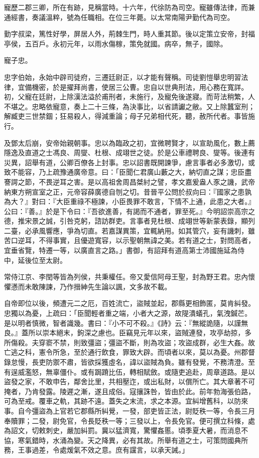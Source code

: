 \begin{pinyinscope}
寵歷二郡三卿，所在有跡，見稱當時。十六年，代徐防為司空。寵雖傳法律，而兼通經書，奏議溫粹，號為任職相。在位三年薨。以太常南陽尹勤代為司空。

勤字叔梁，篤性好學，屏居人外，荊棘生門，時人重其節。後以定策立安帝，封福亭侯，五百戶。永初元年，以雨水傷稼，策免就國。病卒，無子，國除。

寵子忠。

忠字伯始，永始中辟司徒府，三遷廷尉正，以才能有聲稱。司徒劉愷舉忠明習法律，宜備機密，於是擢拜尚書，使居三公曹。忠自以世典刑法，用心務在寬詳。初，父寵在廷尉，上除漢法溢於甫刑者，未施行，及寵免後遂寢。而苛法稍繁，人不堪之。忠略依寵意，奏上二十三條，為決事比，以省請讞之敝。又上除蠶室刑；解臧吏三世禁錮；狂易殺人，得減重論；母子兄弟相代死，聽，赦所代者。事皆施行。

及鄧太后崩，安帝始親朝事。忠以為臨政之初，宜微聘賢才，以宣助風化，數上薦隱逸及直道之士馮良、周燮、杜根、成翊世之徒。於是公車禮聘良、燮等。後連有災異，詔舉有道，公卿百僚各上封事。忠以詔書既開諫爭，慮言事者必多激切，或致不能容，乃上疏豫通廣帝意。曰：「臣聞仁君廣山藪之大，納切直之謀；忠臣盡謇諤之節，不畏逆耳之害。是以高祖舍周昌桀紂之譬，孝文嘉爰盎人豕之譏，武帝納東方朔宣室之正，元帝容薛廣德自刎之切。昔晉平公問於叔向曰：『國家之患孰為大？』對曰：『大臣重祿不極諫，小臣畏罪不敢言，下情不上通，此患之大者。』公曰：『善。』於是下令曰：『吾欲進善，有謁而不通者，罪至死。』今明詔崇高宗之德，推宋景之誠，引咎克躬，諮訪群吏。言事者見杜根、成翊世等新蒙表錄，顯列二臺，必承風響應，爭為切直。若嘉謀異策，宜輒納用。如其管穴，妄有譏刺，雖苦口逆耳，不得事實，且優遊寬容，以示聖朝無諱之美。若有道之士，對問高者，宜垂省覽，特遷一等，以廣直言之路。」書御，有詔拜有道高第士沛國施延為侍中，延後位至太尉。

常侍江京、李閏等皆為列侯，共秉權任。帝又愛信阿母王聖，封為野王君。忠內懷懼懣而未敢陳諫，乃作搢紳先生論以諷，文多故不載。

自帝即位以後，頻遭元二之厄，百姓流亡，盜賊並起，郡縣更相飾匿，莫肯糾發。忠獨以為憂，上疏曰：「臣聞輕者重之端，小者大之源，故隄潰蟻孔，氣洩鍼芒。是以明者慎微，智者識幾。書曰：『小不可不殺。』《詩》云：『無縱詭隨，以謹無良。』蓋所以崇本絕末，鉤深之慮也。臣竊見元年以來，盜賊連發，攻亭劫掠，多所傷殺。夫穿窬不禁，則致彊盜；彊盜不斷，則為攻盜；攻盜成群，必生大姦。故亡逃之科，憲令所急，至於通行飲食，罪致大辟。而頃者以來，莫以為憂。州郡督錄怠慢，長吏防禦不肅，皆欲採獲虛名，諱以盜賊為負。雖有發覺，不務清澄。至有逞威濫怒，無辜僵仆。或有跼蹐比伍，轉相賦斂。或隨吏追赴，周章道路。是以盜發之家，不敢申告，鄰舍比里，共相壓迮，或出私財，以償所亡。其大章著不可掩者，乃肯發露。陵遲之漸，遂且成俗。寇攘誅咎，皆由於此。前年勃海張伯路，可為至戒。覆車之軌，其跡不遠。蓋失之末流，求之本源。宜糾增舊科，以防來事。自今彊盜為上官若它郡縣所糾覺，一發，部吏皆正法，尉貶秩一等，令長三月奉贖罪；二發，尉免官，令長貶秩一等；三發以上，令長免官。便可撰立科條，處為詔文，切敕刺史，嚴加糾罰。冀以猛濟寬，驚懼姦慝。頃季夏大暑，而消息不協，寒氣錯時，水涌為變。天之降異，必有其故。所舉有道之士，可策問國典所務，王事過差，令處煖氣不效之意。庶有讜言，以承天誡。」


\end{pinyinscope}
